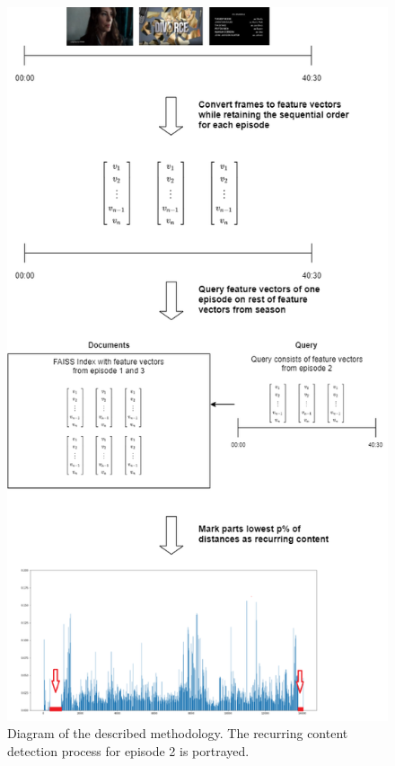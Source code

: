 \documentclass{report}
\begin{document}
\begin{figure}[H]
	\includegraphics[width=\textwidth, center, scale=0.75]{images/thesisdiagram.png}
	\centering
	\caption{Diagram of the described methodology. The recurring content detection process for episode 2 is portrayed.}
	\label{fig:diagram}
\end{figure}
\end{document}
